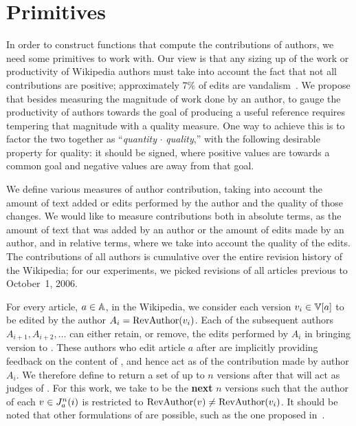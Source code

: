 \section{Primitives}

In order to construct functions that compute the contributions
of authors, we need some primitives to work with.
Our view is that any sizing up of the work or productivity
of Wikipedia authors must take into account the fact that
not all contributions are positive; approximately 7\%
of edits are vandalism~\cite{Potthast2008,Potthast2010a}.
We propose that besides measuring the magnitude of work done
by an author, to gauge the productivity of authors towards the
goal of producing a useful reference requires tempering that
magnitude with a quality measure.
One way to achieve this is to factor the two together
as ``\textit{quantity} $\cdot$ \textit{quality},'' with the
following desirable property for quality: it should be signed,
where positive values are towards a common goal and negative
values are away from that goal.

We define various measures of author contribution, taking into
account the amount of text added or edits performed by the author
and the quality of those changes.
We would like to measure contributions both in absolute terms,
as the amount of text that was added by an author or the
amount of edits made by an author, and in relative terms, 
where we take into account the quality of the edits.
The contributions of all authors is cumulative over the 
entire revision history of the Wikipedia;
for our experiments, we picked revisions of all articles
previous to October~1, 2006.

For every article, $a \in \mathbb{A}$, in the Wikipedia,
we consider each version $\version{i} \in \versions{a}$
to be edited by the author $A_i = \mathrm{RevAuthor}(v_{i})$.
Each of the subsequent authors $A_{i+1}, A_{i+2}, \ldots$ can either
retain, or remove, the edits performed by $A_i$ in bringing
version  to .
These authors who edit article $a$ after 
are implicitly providing feedback on the content of , and hence
act as  of the contribution made by author $A_i$.
We therefore define  to return a set of up to $n$ versions
after  that will act as judges of .
For this work, we take  to be the \textbf{next} $n$
versions such that the author of each $v_{} \in J_{a}^{n}(i)$
is restricted to $\mathrm{RevAuthor}(v_{}) \ne \mathrm{RevAuthor}(v_{i})$.
It should be noted that other formulations of 
are possible, such as the one proposed in~\cite{Chatterjee2008}.

